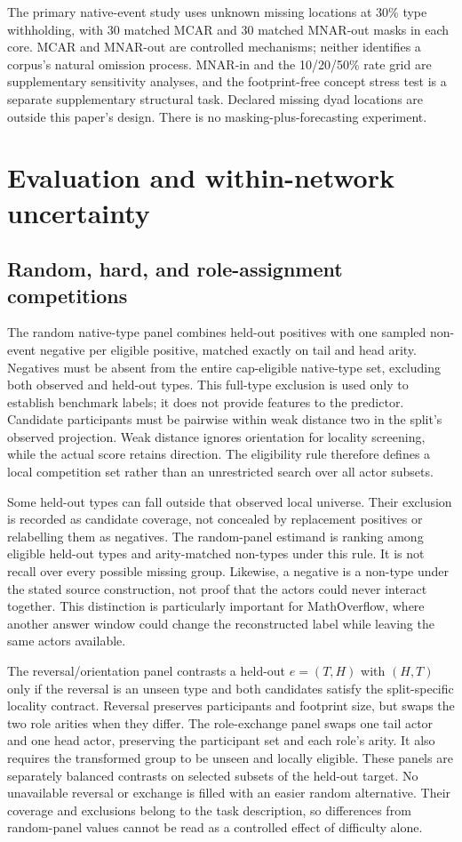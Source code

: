 \documentclass[10pt]{article}
\begin{document}
The primary native-event study uses unknown missing locations at 30\% type withholding, with 30 matched MCAR and 30 matched MNAR-out masks in each core. MCAR and MNAR-out are controlled mechanisms; neither identifies a corpus's natural omission process. MNAR-in and the 10/20/50\% rate grid are supplementary sensitivity analyses, and the footprint-free concept stress test is a separate supplementary structural task. Declared missing dyad locations are outside this paper's design. There is no masking-plus-forecasting experiment.

\section{Evaluation and within-network uncertainty}
\subsection{Random, hard, and role-assignment competitions}
The random native-type panel combines held-out positives with one sampled non-event negative per eligible positive, matched exactly on tail and head arity. Negatives must be absent from the entire cap-eligible native-type set, excluding both observed and held-out types. This full-type exclusion is used only to establish benchmark labels; it does not provide features to the predictor. Candidate participants must be pairwise within weak distance two in the split's observed projection. Weak distance ignores orientation for locality screening, while the actual score retains direction. The eligibility rule therefore defines a local competition set rather than an unrestricted search over all actor subsets.

Some held-out types can fall outside that observed local universe. Their exclusion is recorded as candidate coverage, not concealed by replacement positives or relabelling them as negatives. The random-panel estimand is ranking among eligible held-out types and arity-matched non-types under this rule. It is not recall over every possible missing group. Likewise, a negative is a non-type under the stated source construction, not proof that the actors could never interact together. This distinction is particularly important for MathOverflow, where another answer window could change the reconstructed label while leaving the same actors available.

The reversal/orientation panel contrasts a held-out $e=(T,H)$ with $(H,T)$ only if the reversal is an unseen type and both candidates satisfy the split-specific locality contract. Reversal preserves participants and footprint size, but swaps the two role arities when they differ. The role-exchange panel swaps one tail actor and one head actor, preserving the participant set and each role's arity. It also requires the transformed group to be unseen and locally eligible. These panels are separately balanced contrasts on selected subsets of the held-out target. No unavailable reversal or exchange is filled with an easier random alternative. Their coverage and exclusions belong to the task description, so differences from random-panel values cannot be read as a controlled effect of difficulty alone.
\end{document}
